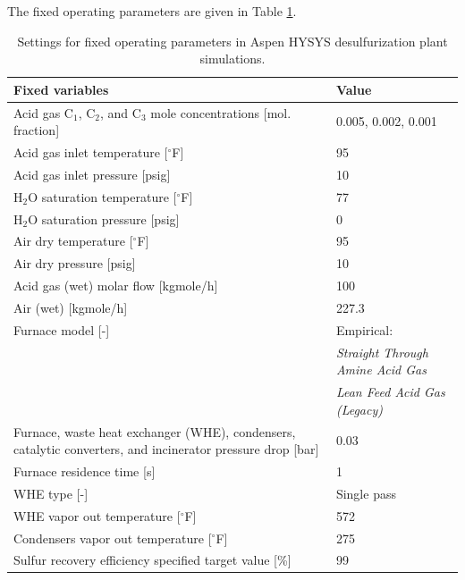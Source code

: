 \documentclass[11pt]{report}
\begin{document}
The fixed operating parameters are given in Table  \ref{tab:Claus_aspen1}. 

\begin{table}
\begin{scriptsize}
\caption{Settings for fixed operating parameters in Aspen HYSYS desulfurization plant simulations.}
\label{tab:Claus_aspen1}
\begin{tabular*}{1\columnwidth}{p{}p{}}
\toprule
Fixed variables & Value\\
\midrule
Acid gas C$_1$, C$_2$, and C$_3$ mole concentrations {[}mol. fraction{]} & 0.005, 0.002, 0.001   \\
Acid gas inlet temperature {[}$^\circ$F{]}                                               & 95       \\
Acid gas inlet pressure {[}psig{]}                                 & 10    \\
H$_2$O saturation temperature {[}$^\circ$F{]}                                                           & 77   \\
H$_2$O saturation pressure {[}psig{]}                                                  & 0  \\
Air dry temperature {[}$^\circ$F{]}                                            & 95    \\
Air dry pressure {[}psig{]}                                  & 10    \\
Acid gas (wet) molar flow {[}kgmole/h{]}                                 & 100   \\
Air (wet) {[}kgmole/h{]}                    & 227.3  \\
Furnace model {[}-{]}                      &     Empirical: \\
						&	     \emph{Straight Through Amine Acid Gas} \\
					          &            \emph{Lean Feed Acid Gas (Legacy)}   \\
Furnace, waste heat exchanger (WHE), condensers, catalytic converters, and incinerator pressure drop {[}bar{]}      &   0.03   \\
Furnace residence time {[}s{]}        &   1\\
WHE type {[}-{]}                              &  Single pass\\
WHE vapor out temperature {[}$^\circ$F{]}  &     572  	  \\ 
Condensers vapor out temperature {[}$^\circ$F{]}         &      275    \\
Sulfur recovery efficiency specified target value {[}\%{]}            &    99\\

\end{tabular*}
\end{scriptsize}
\end{table}
\end{document}
